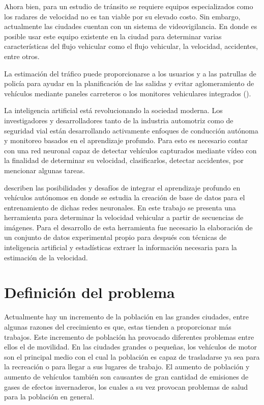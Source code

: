 Ahora bien, para un estudio de tránsito se requiere equipos especializados como los radares de velocidad no es tan viable por su elevado costo. Sin embargo, actualmente las ciudades cuentan con un sistema de videovigilancia. En donde es posible usar este equipo existente en la ciudad para determinar varias características del flujo vehicular como el flujo vehicular, la velocidad, accidentes, entre otros.

La estimación del tráfico puede proporcionarse a los usuarios y a las patrullas de policía para ayudar en la planificación de las salidas y evitar aglomeramiento de vehículos mediante paneles carreteros o los monitores vehiculares integrados (\cite{impedovo2019Vehicular}).

La inteligencia artificial está revolucionando la sociedad moderna. Los investigadores y desarrolladores tanto de la industria automotriz como de seguridad vial están desarrollando activamente enfoques de conducción autónoma y monitoreo basados en el aprendizaje profundo. Para esto es necesario contar con una red neuronal capaz de detectar vehículos capturados mediante vídeo con la finalidad de determinar su velocidad, clasificarlos, detectar accidentes, por mencionar algunas tareas.

\citeauthor{rao2018Deep} describen las posibilidades y desafíos de integrar el aprendizaje profundo en vehículos autónomos en donde se estudia la creación de base de datos para el entrenamiento de dichas redes neuronales. En este trabajo se presenta una herramienta para 
determinar la velocidad vehicular a partir de secuencias de imágenes. Para el desarrollo de esta herramienta fue necesario la elaboración de un conjunto de datos experimental propio para después con técnicas de inteligencia artificial y estadísticas extraer la información necesaria para la estimación de la velocidad.



\section{Definición del problema}

Actualmente hay un incremento de la población en las grandes ciudades, entre algunas razones del crecimiento es que, estas tienden a proporcionar más trabajos. Este incremento de población ha provocado diferentes problemas entre ellos el de movilidad. En las ciudades grandes o pequeñas, los vehículos de motor son el principal medio con el cual la población es capaz de trasladarse ya sea para la recreación o para llegar a sus lugares de trabajo. El aumento de población y aumento de vehículos también son causantes de gran cantidad de emisiones de gases de efectos invernaderos, los cuales a su vez provocan problemas de salud para la población en general.

